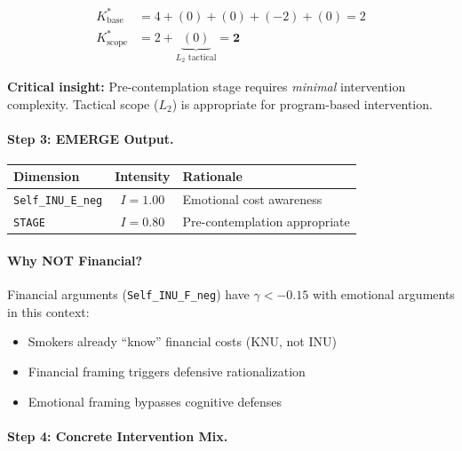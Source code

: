 \begin{align}
K^*_{\text{base}} &= 4 + (0) + (0) + (-2) + (0) = 2 \\
K^*_{\text{scope}} &= 2 + \underbrace{(0)}_{L_2 \text{ tactical}} = \mathbf{2}
\end{align}

\textbf{Critical insight:} Pre-contemplation stage requires \emph{minimal} intervention complexity. Tactical scope ($L_2$) is appropriate for program-based intervention.

\paragraph{Step 3: EMERGE Output.}

\begin{center}
\begin{tabular}{@{}lcl@{}}
\toprule
\textbf{Dimension} & \textbf{Intensity} & \textbf{Rationale} \\
\midrule
\texttt{Self\_INU\_E\_neg} & $I = 1.00$ & Emotional cost awareness \\
\texttt{STAGE} & $I = 0.80$ & Pre-contemplation appropriate \\
\bottomrule
\end{tabular}
\end{center}

\paragraph{Why NOT Financial?}

Financial arguments (\texttt{Self\_INU\_F\_neg}) have $\gamma < -0.15$ with emotional arguments in this context:
\begin{itemize}[nosep]
    \item Smokers already ``know'' financial costs (KNU, not INU)
    \item Financial framing triggers defensive rationalization
    \item Emotional framing bypasses cognitive defenses
\end{itemize}

\paragraph{Step 4: Concrete Intervention Mix.}

